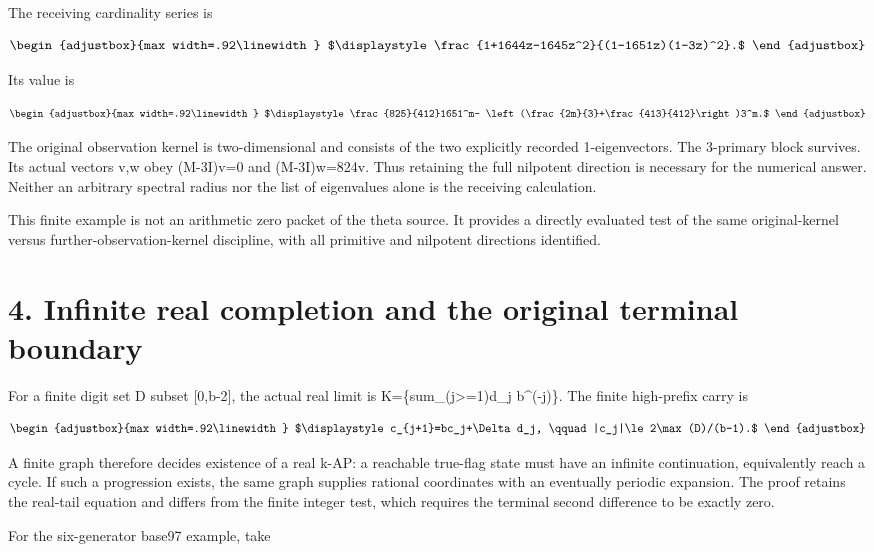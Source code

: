 The receiving cardinality series is

\[
\begin{adjustbox}{max width=.92\linewidth}
$\displaystyle \frac{1+1644z-1645z^2}{(1-1651z)(1-3z)^2}.$
\end{adjustbox}
\]

Its value is

\[
\begin{adjustbox}{max width=.92\linewidth}
$\displaystyle \frac{825}{412}1651^m-
\left(\frac{2m}{3}+\frac{413}{412}\right)3^m.$
\end{adjustbox}
\]

The original observation kernel is two-dimensional and consists of the two explicitly recorded 1-eigenvectors. The 3-primary block survives. Its actual vectors v,w obey (M-3I)v=0 and (M-3I)w=824v. Thus retaining the full nilpotent direction is necessary for the numerical answer. Neither an arbitrary spectral radius nor the list of eigenvalues alone is the receiving calculation.

This finite example is not an arithmetic zero packet of the theta source. It provides a directly evaluated test of the same original-kernel versus further-observation-kernel discipline, with all primitive and nilpotent directions identified.

\section{4. Infinite real completion and the original terminal boundary}\label{n21-infinite-real-completion-and-the-original-terminal-boundary}

For a finite digit set D subset {[}0,b-2{]}, the actual real limit is K=\{sum\_(j\textgreater=1)d\_j b\^{}(-j)\}. The finite high-prefix carry is

\[
\begin{adjustbox}{max width=.92\linewidth}
$\displaystyle c_{j+1}=bc_j+\Delta d_j,
\qquad |c_j|\le 2\max(D)/(b-1).$
\end{adjustbox}
\]

A finite graph therefore decides existence of a real k-AP: a reachable true-flag state must have an infinite continuation, equivalently reach a cycle. If such a progression exists, the same graph supplies rational coordinates with an eventually periodic expansion. The proof retains the real-tail equation and differs from the finite integer test, which requires the terminal second difference to be exactly zero.

For the six-generator base97 example, take

